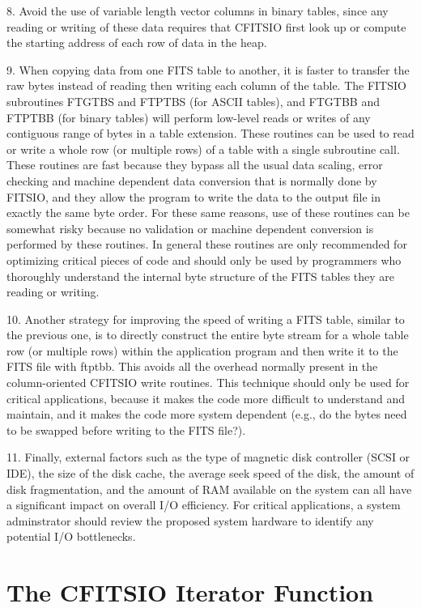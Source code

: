 \documentclass[11pt]{book}
\begin{document}
8. Avoid the use of variable length vector columns in binary tables,
since any reading or writing of these data requires that CFITSIO first
look up or compute the starting address of each row of data in the
heap.

9. When copying data from one FITS table to another, it is faster to
transfer the raw bytes instead of reading then writing each column of
the table.  The FITSIO subroutines FTGTBS and FTPTBS (for ASCII
tables), and  FTGTBB and FTPTBB (for binary tables) will perform
low-level reads or writes of any contiguous range of bytes in a table
extension.  These routines can be used to read or write a whole row (or
multiple rows) of a table with a single subroutine call.   These
routines are fast because they bypass all the usual data scaling, error
checking and machine dependent data conversion that is normally done by
FITSIO, and they allow the program to write the data to the output file
in exactly the same byte order.  For these same reasons, use of these
routines can be somewhat risky because no validation or machine
dependent conversion is performed by these routines.  In general these
routines are only recommended for optimizing critical pieces of code
and should only be used by programmers who thoroughly understand the
internal byte structure of the FITS tables they are reading or
writing.

10. Another strategy for improving the speed of writing a FITS table,
similar to the previous one, is to directly construct the entire byte
stream for a whole table row (or multiple rows) within the application
program and then write it to the FITS file with
ftptbb.  This avoids all the overhead normally present
in the column-oriented CFITSIO write routines.  This technique should
only be used for critical applications, because it makes the code more
difficult to understand and maintain, and it makes the code more system
dependent (e.g., do the bytes need to be swapped before writing to the
FITS file?).

11.  Finally, external factors such as the type of magnetic disk
controller (SCSI or IDE), the size of the disk cache, the average seek
speed of the disk, the amount of disk fragmentation, and the amount of
RAM available on the system can all have a significant impact on
overall I/O efficiency.  For critical applications, a system
adminstrator should review the proposed system hardware to identify any
potential I/O bottlenecks.


\chapter{ The CFITSIO Iterator Function }
\end{document}
